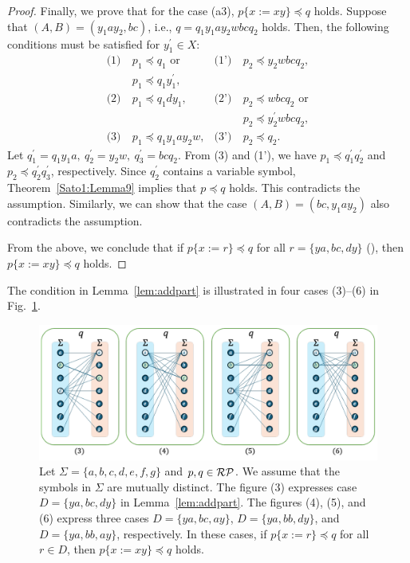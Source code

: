 \begin{proof}
  Finally, we prove that for the case (a3), $p \{ x := xy \} \preceq q$ holds. Suppose that $(A, B) = (y_{1}ay_{2}, bc)$, i.e., $q = q_{1}y_{1}ay_{2}wbcq_{2} $ holds. Then, the following conditions must be satisfied for $y_{1}^{\prime}\in X$:
  \begin{align*}
    \textrm{(1)}~& p_{1} \preceq q_{1}\mbox{ or} & \textrm{(1')}~& p_{2} \preceq y_{2}wbcq_{2}, \\
    & p_{1} \preceq q_{1}y_{1}^{\prime}, & & \\
    \textrm{(2)}~& p_{1} \preceq q_{1}dy_{1}, & \textrm{(2')}~& p_{2} \preceq wbcq_{2}\mbox{ or}\\    
    & & & p_{2} \preceq y_{2}^{\prime}wbcq_{2}, \\
    \textrm{(3)}~& p_{1} \preceq q_{1}y_{1}ay_{2}w, & \textrm{(3')}~& p_{2} \preceq q_{2}.
  \end{align*}
  Let $q^{\prime}_{1}=q_{1}y_{1}a,~q^{\prime}_{2}=y_{2}w,~q^{\prime}_{3}=bcq_{2}$. From (3) and (1'), we have $p_{1} \preceq q^{\prime}_{1}q^{\prime}_{2}$ and $p_{2} \preceq q^{\prime}_{2}q^{\prime}_{3}$, respectively.
  Since $q_{2}^{\prime}$ contains a variable symbol, Theorem~\ref{Sato1:Lemma9} implies that $p \preceq q$ holds.
  This contradicts the assumption.
  Similarly, we can show that the case $(A, B) = (bc, y_{1}ay_{2})$ also contradicts the assumption.
  
  \smallskip
  
  From the above, we conclude that if $p \{ x := r \} \preceq q$ for all $r = \{ ya, bc, dy \}$ (\TheConditionA), then $p \{ x := xy \} \preceq q$ holds.
  \end{proof}

  The condition in Lemma~\ref{lem:addpart} is illustrated in four cases (3)--(6) in Fig.~\ref{fig:lem5bigraph}.

  \begin{figure}[t]
    \begin{center}
      \includegraphics[scale=0.525]{figs/lem5bigraph.pdf}
      \caption{Let $\Sigma=\{a,b,c,d,e,f,g\}$ and $p,q \in \mathcal{RP}$. We assume that the symbols in $\Sigma$ are mutually distinct. The figure (3) expresses case $D = \{ ya, bc, dy \}$ in Lemma~\ref{lem:addpart}.
      The figures (4), (5), and (6) express three cases $D = \{ ya, bc, ay \}$, $D = \{ ya, bb, dy \}$, and $D = \{ ya, bb, ay \}$, respectively.
      In these cases, if $p \{ x := r \} \preceq q$ for all $r \in D$, then $p \{ x := xy \} \preceq q$ holds.}\label{fig:lem5bigraph}
    \end{center}
  \end{figure}

